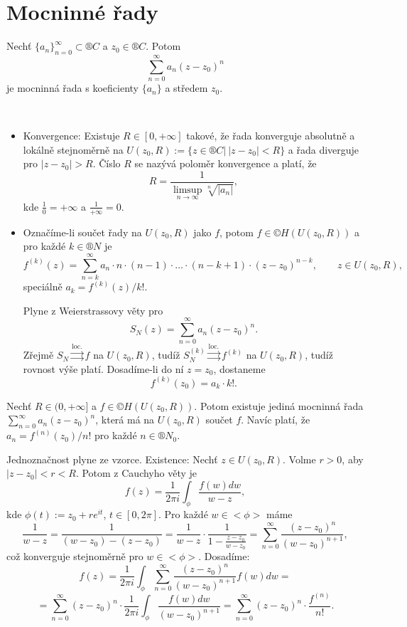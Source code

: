 \documentclass[12pt]{article}					%
\begin{document}

\section{Mocninné řady}
\begin{definice}
	Nechť $\{a_n\}_{n=0}^∞ \subset ®C$ a $z_0 \in ®C$. Potom
	$$ \sum_{n=0}^∞ a_n (z - z_0)^n $$
	je mocninná řada s koeficienty $\{a_n\}$ a středem $z_0$.
\end{definice}

\begin{poznamka}[Vlastnosti]
	\ 

	\vspace{-2em}

	\begin{itemize}
		\item Konvergence: Existuje $R \in [0, +∞]$ takové, že řada konverguje absolutně a lokálně stejnoměrně na $U(z_0, R) := \{z \in ®C |\ |z - z_0| < R\}$ a řada diverguje pro $|z - z_0| > R$. Číslo $R$ se nazývá poloměr konvergence a platí, že
			$$ R = \frac{1}{\limsup_{n\rightarrow ∞} \sqrt[n]{|a_n|}}, $$
			kde $\frac{1}{0} = +∞$ a $\frac{1}{+∞} = 0$.
		\item Označíme-li součet řady na $U(z_0, R)$ jako $f$, potom $f \in ©H(U(z_0, R))$ a pro každé $k \in ®N$ je
			$$ f^{(k)}(z) = \sum_{n=k}^∞a_n · n · (n-1) · … ·(n-k+1)·(z - z_0)^{n-k}, \qquad z \in U(z_0, R), $$
			speciálně $a_k = f^{(k)}(z) / k!$.
		
			Plyne z Weierstrassovy věty pro
			$$ S_N(z) = \sum_{n=0}^∞ a_n(z - z_0)^n. $$
			Zřejmě $S_N \overset{\text{loc.}}\rightrightarrows f$ na $U(z_0, R)$, tudíž $S_N^{(k)} \overset{\text{loc.}}\rightrightarrows f^{(k)}$ na $U(z_0, R)$, tudíž rovnost výše platí. Dosadíme-li do ní $z = z_0$, dostaneme
			$$ f^{(k)}(z_0) = a_k·k!. $$
	\end{itemize}
\end{poznamka}

\begin{veta}
	Nechť $R \in (0, +∞]$ a $f \in ©H(U(z_0, R))$. Potom existuje jediná mocninná řada $\sum_{n=0}^∞ a_n(z - z_0)^n$, která má na $U(z_0, R)$ součet $f$. Navíc platí, že $a_n = f^{(n)}(z_0) / n!$ pro každé $n \in ®N_0$.

	\begin{dukazin}
		Jednoznačnost plyne ze vzorce. Existence: Nechť $z \in U(z_0, R)$. Volme $r > 0$, aby $|z - z_0| < r < R$. Potom z Cauchyho věty je
		$$ f(z) = \frac{1}{2\pi i} \int_\phi \frac{f(w) dw}{w - z}, $$
		kde $\phi(t) := z_0 + r e^{i t}$, $t \in [0, 2\pi]$. Pro každé $w \in <\phi>$ máme
		$$ \frac{1}{w - z} = \frac{1}{(w - z_0) - (z - z_0)} = \frac{1}{w - z}·\frac{1}{1 - \frac{z - z_0}{w - z_0}} = \sum_{n=0}^∞ \frac{(z - z_0)^n}{(w - z_0)^{n+1}}, $$
		což konverguje stejnoměrně pro $w \in <\phi>$. Dosadíme:
		$$ f(z) = \frac{1}{2\pi i} \int_\phi \sum_{n=0}^∞ \frac{(z - z_0)^n}{(w - z_0)^{n+1}} f(w) dw = $$
		$$ = \sum_{n=0}^∞ (z - z_0)^n · \frac{1}{2\pi i} \int_\phi \frac{f(w) dw}{(w - z_0)^{n+1}} = \sum_{n=0}^∞ (z - z_0)^n · \frac{f^{(n)}}{n!}. $$
	\end{dukazin}
\end{veta}
\end{document}
